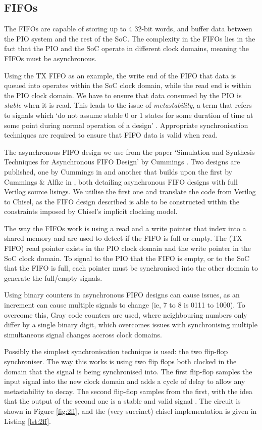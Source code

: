 \subsection{FIFOs}

The FIFOs are capable of storing up to 4 32-bit words, and buffer data between the PIO system and the rest of the SoC. The complexity in the FIFOs lies in the fact that the PIO and the SoC operate in different clock domains, meaning the FIFOs must be asynchronous.

Using the TX FIFO as an example, the write end of the FIFO that data is queued into operates within the SoC clock domain, while the read end is within the PIO clock domain. We have to ensure that data consumed by the PIO is \textit{stable} when it is read. This leads to the issue of \textit{metastability}, a term that refers to signals which `do not assume stable 0 or 1 states for some duration of time at
some point during normal operation of a design' \cite{cdc}. Appropriate synchronisation techniques are required to ensure that FIFO data is valid when read.

The asynchronous FIFO design we use from the paper `Simulation and Synthesis Techniques for Asynchronous
FIFO Design' by Cummings \cite{fifo1}. Two designs are published, one by Cummings in \cite{fifo1} and another that builds upon the first by Cummings \& Alfke in \cite{fifo2}, both detailing asynchronous FIFO designs with full Verilog source lisings. We utilise the first one and translate the code from Verilog to Chisel, as the FIFO design described is able to be constructed within the constraints imposed by Chisel's implicit clocking model.

The way the FIFOs work is using a read and a write pointer that index into a shared memory and are used to detect if the FIFO is full or empty. The (TX FIFO) read pointer exists in the PIO clock domain and the write pointer in the SoC clock domain. To signal to the PIO that the FIFO is empty, or to the SoC that the FIFO is full, each pointer must be synchronised into the other domain to generate the full/empty signals.

Using binary counters in asynchronous FIFO designs can cause issues, as an increment can cause multiple signals to change (ie, 7 to 8 is 0111 to 1000). To overcome this, Gray code counters are used, where neighbouring numbers only differ by a single binary digit, which overcomes issues with synchronising multiple simultaneous signal changes accross clock domains.

Possibly the simplest synchronisation technique is used: the two flip-flop synchroniser. The way this works is using two flip flops both clocked in the domain that the signal is being synchronised into. The first flip-flop samples the input signal into the new clock domain and adds a cycle of delay to allow any metastability to decay. The second flip-flop samples from the first, with the idea that the output of the second one is a stable and valid signal \cite{cdc}. The circuit is shown in Figure \ref{fig:2ff}, and the (very succinct) chisel implementation is given in Listing \ref{lst:2ff}.

